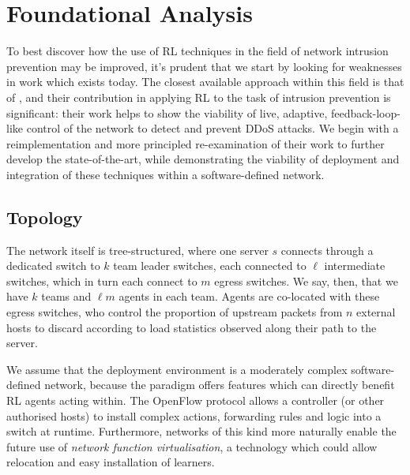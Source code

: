 \documentclass[conference, a4paper, 10pt, times]{IEEEtran}
\begin{document}
\section{Foundational Analysis}\label{sec:environment-and-rl-algorithm}
To best discover how the use of RL techniques in the field of network intrusion prevention may be improved, it's prudent that we start by looking for weaknesses in work which exists today.
The closest available approach within this field is that of \textcite{DBLP:journals/eaai/MalialisK15}, and their contribution in applying RL to the task of intrusion prevention is significant: their work helps to show the viability of live, adaptive, feedback-loop-like control of the network to detect and prevent DDoS attacks.
We begin with a reimplementation and more principled re-examination of their work to further develop the state-of-the-art, while demonstrating the viability of deployment and integration of these techniques within a software-defined network.



\subsection{Topology}\label{sec:topology}

The network itself is tree-structured, where one server $s$ connects through a dedicated switch to $k$ team leader switches, each connected to $\ell$ intermediate switches, which in turn each connect to $m$ egress switches.
We say, then, that we have $k$ teams and $\ell m$ agents in each team.
Agents are co-located with these egress switches, who control the proportion of upstream packets from $n$ external hosts to discard according to load statistics observed along their path to the server.

We assume that the deployment environment is a moderately complex software-defined network, because the paradigm offers features which can directly benefit RL agents acting within.
The OpenFlow protocol allows a controller (or other authorised hosts) to install complex actions, forwarding rules and logic into a switch at runtime.
Furthermore, networks of this kind more naturally enable the future use of \emph{network function virtualisation}, a technology which could allow relocation and easy installation of learners.
\end{document}
